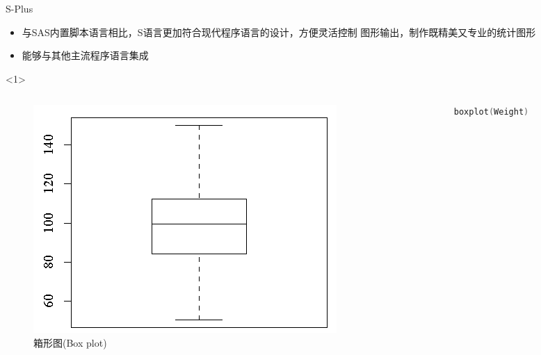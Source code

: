 \documentclass{beamerthemeMono}
\begin{document}
\begin{frame}[t, fragile]{\subsecname}{S-Plus}
    \begin{itemize}
      \item 与SAS内置脚本语言相比，S语言更加符合现代程序语言的设计，方便灵活控制
            图形输出，制作既精美又专业的统计图形
      \item 能够与其他主流程序语言集成
    \end{itemize}

    \begin{onlyenv}<1>
      \begin{columns}
        \begin{column}{.7\textwidth}
          \begin{figure}
            \centering
            \includegraphics[width=0.8\columnwidth]{splus_boxplot.png}
            \caption{箱形图(Box plot)}
          \end{figure}
        \end{column}

        \begin{column}{.3\textwidth}
\begin{lstlisting}[language=S]
  boxplot(Weight)
\end{lstlisting}
        \end{column}
      \end{columns}
    \end{onlyenv}
\end{frame}    
\end{document}

